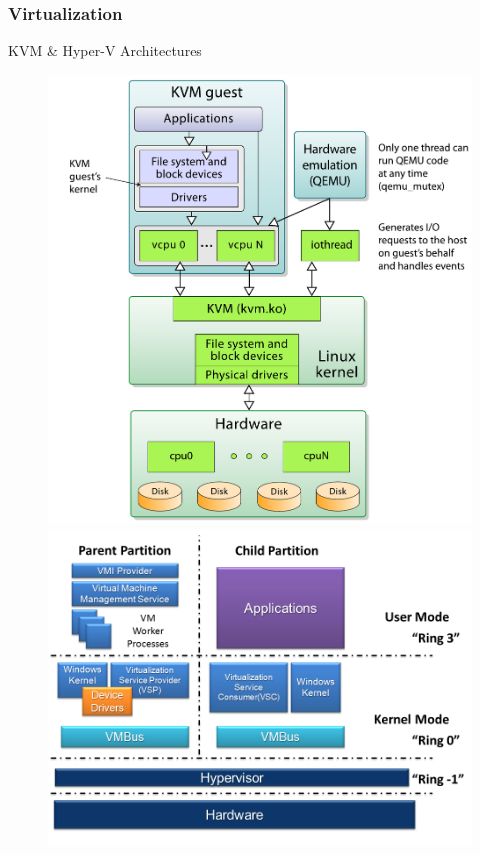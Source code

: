 \documentclass[aspectratio=169]{beamer}
\begin{document}
\begin{frame}[t]
\frametitle{Virtualization}
{\Large KVM \& Hyper-V Architectures \\}
\begin{figure}[htbp]
\centering
\includegraphics[scale=0.28]{img/Kernel-based_Virtual_Machine.pdf}
\qquad
\includegraphics[scale=0.323]{img/Hyper-V.png}
\end{figure}
\end{frame}
\end{document}
